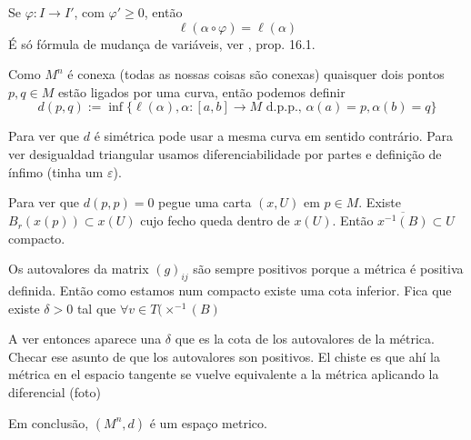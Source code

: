 \begin{remark}\leavevmode
Se \(\varphi:I \to I'\), com \(\varphi' \geq 0\), então
\[\ell(\alpha \circ \varphi) = \ell(\alpha)\]
{\color{4}É só fórmula de mudança de variáveis, ver \cite{tud}, prop. 16.1.}

\end{remark}

Como \(M^n\) é conexa (todas as nossas coisas são conexas) quaisquer dois pontos \(p,q \in M\) estão ligados por uma curva, então podemos definir
\[d(p,q):= \operatorname{inf}\{ \ell (\alpha),\alpha:[a,b] \to M \text{ d.p.p., }\alpha(a)=p,\alpha(b)=q \}\]

Para ver que \(d\) é simétrica pode usar a mesma curva em sentido contrário. Para ver desigualdad triangular usamos diferenciabilidade por partes e definição de ínfimo (tinha um \(\varepsilon\)).

Para ver que \(d(p,p)=0\) pegue uma carta  \((x,U)\) em \(p \in M\). Existe \(B_r(x(p)) \subset x(U)\) cujo fecho queda dentro de \(x (U)\). Então \(\overline{x^{-1}(B)} \subset U\) compacto.

Os autovalores da matrix \((g)_{ij}\) são sempre positivos porque a métrica é positiva definida. Então como estamos num compacto existe uma cota inferior. Fica que existe \(\delta>0\) tal que \(\forall  v \in T(\times^{-1}(B)\)


A ver entonces aparece una \(\delta\) que es la cota de los autovalores de la métrica. {\color{7}Checar} ese asunto de que los autovalores son positivos. El chiste es que ahí la métrica en el espacio tangente se vuelve equivalente a la métrica aplicando la diferencial (foto)

Em conclusão, \((M^n, d)\) é um espaço metrico.

